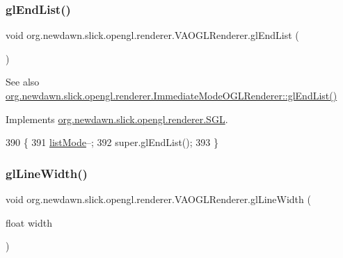 \subsubsection{\texorpdfstring{gl\+End\+List()}{glEndList()}}
{\footnotesize\ttfamily void org.\+newdawn.\+slick.\+opengl.\+renderer.\+V\+A\+O\+G\+L\+Renderer.\+gl\+End\+List (\begin{DoxyParamCaption}{ }\end{DoxyParamCaption})\hspace{0.3cm}{\ttfamily [inline]}}

\begin{DoxySeeAlso}{See also}
\mbox{\hyperlink{classorg_1_1newdawn_1_1slick_1_1opengl_1_1renderer_1_1_immediate_mode_o_g_l_renderer_a2896ef315ccd6ee04732a3f8c717ffc1}{org.\+newdawn.\+slick.\+opengl.\+renderer.\+Immediate\+Mode\+O\+G\+L\+Renderer\+::gl\+End\+List()}} 
\end{DoxySeeAlso}


Implements \mbox{\hyperlink{interfaceorg_1_1newdawn_1_1slick_1_1opengl_1_1renderer_1_1_s_g_l_a300a1d9b3c984ccc0a59eb951821bf37}{org.\+newdawn.\+slick.\+opengl.\+renderer.\+S\+GL}}.


\begin{DoxyCode}
390                             \{
391         \mbox{\hyperlink{classorg_1_1newdawn_1_1slick_1_1opengl_1_1renderer_1_1_v_a_o_g_l_renderer_afee8361b229cada04ad11d9ee44c7284}{listMode}}--;
392         super.glEndList();
393     \}
\end{DoxyCode}
\mbox{\label{classorg_1_1newdawn_1_1slick_1_1opengl_1_1renderer_1_1_v_a_o_g_l_renderer_a2dec01f79be6ca9a13fb785cb03dcdbc}} 
\subsubsection{\texorpdfstring{gl\+Line\+Width()}{glLineWidth()}}
{\footnotesize\ttfamily void org.\+newdawn.\+slick.\+opengl.\+renderer.\+V\+A\+O\+G\+L\+Renderer.\+gl\+Line\+Width (\begin{DoxyParamCaption}\item[{float}]{width }\end{DoxyParamCaption})\hspace{0.3cm}{\ttfamily [inline]}}

